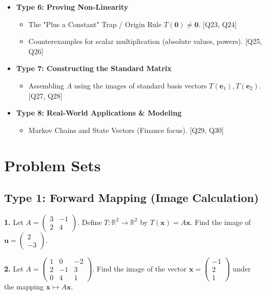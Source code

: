 \documentclass{article}
\begin{document}
\begin{itemize}
    \item \textbf{Type 6: Proving Non-Linearity}
    \begin{itemize}
        \item The "Plus a Constant" Trap / Origin Rule $T(\mathbf{0}) \neq \mathbf{0}$. [Q23, Q24]
        \item Counterexamples for scalar multiplication (absolute values, powers). [Q25, Q26]
    \end{itemize}
    
    \item \textbf{Type 7: Constructing the Standard Matrix}
    \begin{itemize}
        \item Assembling $A$ using the images of standard basis vectors $T(\mathbf{e}_1), T(\mathbf{e}_2)$. [Q27, Q28]
    \end{itemize}
    
    \item \textbf{Type 8: Real-World Applications \& Modeling}
    \begin{itemize}
        \item Markov Chains and State Vectors (Finance focus). [Q29, Q30]
    \end{itemize}
\end{itemize}

\newpage

\section{Problem Sets}

\subsection*{Type 1: Forward Mapping (Image Calculation)}
\textbf{1.} Let $A = \begin{pmatrix} 3 & -1 \\ 2 & 4 \end{pmatrix}$. Define $T: \mathbb{R}^2 \to \mathbb{R}^2$ by $T(\mathbf{x}) = A\mathbf{x}$. Find the image of $\mathbf{u} = \begin{pmatrix} 2 \\ -3 \end{pmatrix}$.

\vspace{0.3cm}
\textbf{2.} Let $A = \begin{pmatrix} 1 & 0 & -2 \\ 2 & -1 & 3 \\ 0 & 4 & 1 \end{pmatrix}$. Find the image of the vector $\mathbf{x} = \begin{pmatrix} -1 \\ 2 \\ 1 \end{pmatrix}$ under the mapping $\mathbf{x} \mapsto A\mathbf{x}$.
\end{document}
